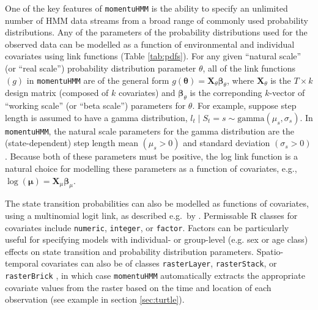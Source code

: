 \documentclass[12pt]{article}\usepackage[]{graphicx}\usepackage[]{color}
\begin{document}
One of the key features of \verb|momentuHMM| is the ability to specify an unlimited number of HMM data streams from a broad range of commonly used probability distributions. Any of the parameters of the probability distributions used for the observed data can be modelled as a function of environmental and individual covariates using link functions (Table \ref{tab:pdfs}). For any given ``natural scale'' (or ``real scale'') probability distribution parameter $\theta$, all of the link functions $(g)$ in \verb|momentuHMM| are of the general form $g({\boldsymbol \theta}) =  {\mathbf X}_\theta{\boldsymbol \beta}_\theta$, where ${\mathbf X}_\theta$ is the $T \times k$ design matrix (composed of $k$ covariates) and ${\boldsymbol \beta}_\theta$ is the correponding $k$-vector of ``working scale'' (or ``beta scale'') parameters for $\theta$. For example, suppose step length is assumed to have a gamma distribution, $l_t\mid S_t=s \sim \text{gamma}(\mu_s,\sigma_s)$. In \verb|momentuHMM|, the natural scale parameters for the gamma distribution are the (state-dependent) step length mean $(\mu_s>0)$ and standard deviation $(\sigma_s>0)$.  Because both of these parameters must be positive, the log link function is a natural choice for modelling these parameters as a function of covariates, e.g., $\log({\boldsymbol \mu}) =  {\mathbf X}_\mu  {\boldsymbol \beta}_\mu$.

The state transition probabilities can also be modelled as functions of covariates, using a multinomial logit link, as described e.g.\ by \cite{MichelotEtAl2016}. Permissable R classes for covariates include \verb|numeric|, \verb|integer|, or \verb|factor|. Factors can be particularly useful for specifying models with individual- or group-level (e.g. sex or age class) effects on state transition and probability distribution parameters. Spatio-temporal covariates can also be of classes \verb|rasterLayer|, \verb|rasterStack|, or \verb|rasterBrick| \citep{Hijmans2016}, in which case \verb|momentuHMM| automatically extracts the appropriate covariate values from the raster based on the time and location of each observation (see example in section \ref{sec:turtle}).
\end{document}
